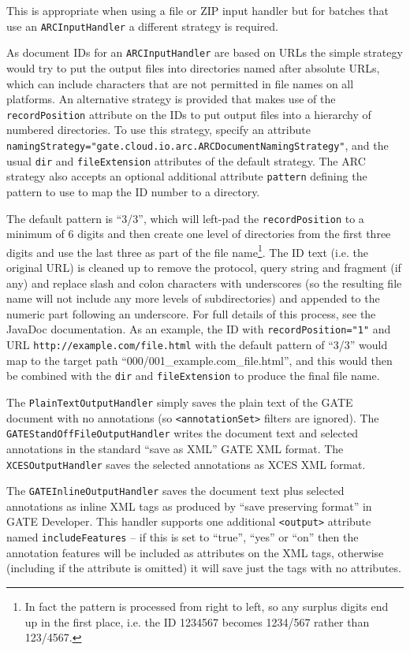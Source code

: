This is appropriate when using a
file or ZIP input handler but for batches that use an \verb!ARCInputHandler! a
different strategy is required.

As document IDs for an \verb!ARCInputHandler! are based on URLs the simple
strategy would try to put the output files into directories named after
absolute URLs, which can include characters that are not permitted in file
names on all platforms.  An alternative strategy is provided that makes use of
the \verb!recordPosition! attribute on the IDs to put output files into a
hierarchy of numbered directories.  To use this strategy, specify an attribute
\verb!namingStrategy="gate.cloud.io.arc.ARCDocumentNamingStrategy"!, and the
usual \verb!dir! and \verb!fileExtension! attributes of the default strategy.
The ARC strategy also accepts an optional additional attribute \verb!pattern!
defining the pattern to use to map the ID number to a directory.

The default pattern is ``3/3'', which will left-pad the \verb!recordPosition!
to a minimum of 6 digits and then create one level of directories from the
first three digits and use the last three as part of the file name\footnote{In
fact the pattern is processed from right to left, so any surplus digits end up
in the first place, i.e. the ID 1234567 becomes 1234/567 rather than
123/4567.}.  The ID text (i.e. the original URL) is cleaned up to remove the
protocol, query string and fragment (if any) and replace slash and colon
characters with underscores (so the resulting file name will not include any
more levels of subdirectories) and appended to the numeric part following an
underscore.  For full details of this process, see the JavaDoc
documentation.  As an example, the ID with \verb!recordPosition="1"! and URL
\verb!http://example.com/file.html! with the default pattern of ``3/3'' would
map to the target path ``000/001\_example.com\_file.html'', and this
would then be combined with the \verb!dir! and \verb!fileExtension! to produce
the final file name.

The \verb!PlainTextOutputHandler! simply saves the plain text of the GATE
document with no annotations (so \verb!<annotationSet>! filters are ignored).
The \verb!GATEStandOffFileOutputHandler! writes the document text and selected
annotations in the standard ``save as XML'' GATE XML format.  The
\verb!XCESOutputHandler! saves the selected annotations as XCES XML format.

The \verb!GATEInlineOutputHandler! saves the document text plus selected
annotations as inline XML tags as produced by ``save preserving format'' in
GATE Developer.  This handler supports one additional \verb!<output>! attribute
named \verb!includeFeatures! -- if this is set to ``true'', ``yes'' or ``on''
then the annotation features will be included as attributes on the XML tags,
otherwise (including if the attribute is omitted) it will save just the tags
with no attributes.

